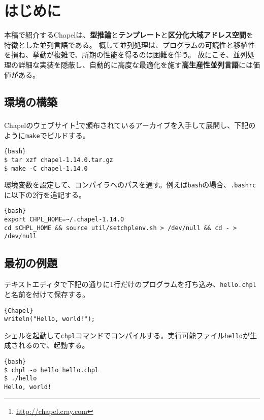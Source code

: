 \documentclass[10pt,a4paper]{book}
\begin{document}
\maketitle
\tableofcontents

\chapter{はじめに}

本稿で紹介するChapelは、\textbf{型推論}と\textbf{テンプレート}と\textbf{区分化大域アドレス空間}を特徴とした並列言語である。
概して並列処理は、プログラムの可読性と移植性を損ね、挙動が複雑で、所期の性能を得るのは困難を伴う。
故にこそ、並列処理の詳細な実装を隠蔽し、自動的に高度な最適化を施す\textbf{高生産性並列言語}には価値がある。

\section{環境の構築}

Chapelのウェブサイト\footnote{\url{http://chapel.cray.com}}で頒布されているアーカイブを入手して展開し、下記のように\verb#make#でビルドする。

\begin{Verbatim}{bash}
$ tar xzf chapel-1.14.0.tar.gz
$ make -C chapel-1.14.0
\end{Verbatim}

環境変数を設定して、コンパイラへのパスを通す。例えば\verb#bash#の場合、\verb#.bashrc#に以下の2行を追記する。

\begin{Verbatim}{bash}
export CHPL_HOME=~/.chapel-1.14.0
cd $CHPL_HOME && source util/setchplenv.sh > /dev/null && cd - > /dev/null
\end{Verbatim}

\section{最初の例題}

テキストエディタで下記の通りに1行だけのプログラムを打ち込み、\verb#hello.chpl#と名前を付けて保存する。

\begin{Verbatim}{Chapel}
writeln("Hello, world!");
\end{Verbatim}

シェルを起動して\verb#chpl#コマンドでコンパイルする。実行可能ファイル\verb#hello#が生成されるので、起動する。

\begin{Verbatim}{bash}
$ chpl -o hello hello.chpl
$ ./hello
Hello, world!
\end{Verbatim}
\end{document}
